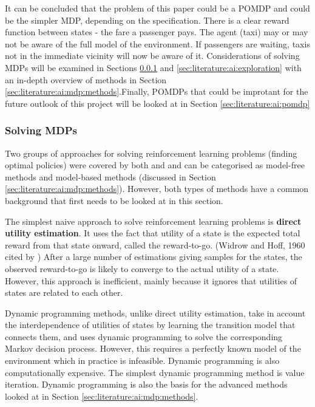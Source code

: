 It can be concluded that the problem of this paper could be a POMDP and could
be the simpler MDP, depending on the specification. There is a clear reward
function between states - the fare a passenger pays. The agent (taxi) may or
may not be aware of the full model of the environment. If passengers are
waiting, taxis not in the immediate vicinity will now be aware of it.
Considerations of solving MDPs will be examined in Sections
\ref{sec:literature:ai:mdp:solving} and \ref{sec:literature:ai:exploration}
with an in-depth overview of methods in Section
\ref{sec:literature:ai:mdp:methods}.Finally, POMDPs that could be improtant for
the future outlook of this project will be looked at in Section
\ref{sec:literature:ai:pomdp}


\subsubsection{Solving MDPs}
\label{sec:literature:ai:mdp:solving}

Two groups of approaches for solving reinforcement learning problems (finding
optimal policies) were covered by both \textcite{Russell2010ai+modern} and
\textcite{Sutton1998ai+reinforcement} and can be categorised as model-free
methods and model-based methods (discussed in Section
\ref{sec:literature:ai:mdp:methods}). However, both types of methods have a
common background that first needs to be looked at in this section.

The simplest naive approach to solve reinforcement learning problems is
\textbf{direct utility estimation}. It uses the fact that utility of a state is
the expected total reward from that state onward, called the reward-to-go.
(Widrow and Hoff, 1960 cited by \textcite{Russell2010ai+modern}) After a large
number of estimations giving samples for the states, the observed reward-to-go
is likely to converge to the actual utility of a state. However, this approach
is inefficient, mainly because it ignores that utilities of states are related
to each other. \parencite{Russell2010ai+modern}

Dynamic programming methods, unlike direct utility estimation, take in account
the interdependence of utilities of states by learning the transition model
that connects them, and uses dynamic programming to solve the corresponding
Markov decision process. However, this requires a perfectly known model of the
environment which in practice is infeasible. Dynamic programming is also
computationally expensive. The simplest dynamic programming method is value
iteration. Dynamic programming is also the basis for the advanced methods
looked at in Section \ref{sec:literature:ai:mdp:methods}.
\parencite{Sutton1998ai+reinforcement}

